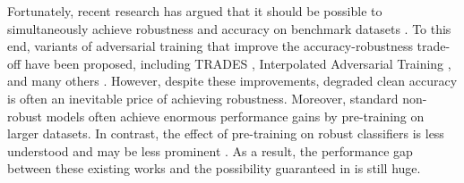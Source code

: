 \documentclass[11pt, letterpaper]{article}
\theoremstyle{plain}
\theoremstyle{definition}
\begin{document}
Fortunately, recent research has argued that it should be possible to simultaneously achieve robustness and accuracy on benchmark datasets \citep{Yang20}. To this end, variants of adversarial training that improve the accuracy-robustness trade-off have been proposed, including TRADES \citep{Zhang19}, Interpolated Adversarial Training \citep{Lamb19}, and many others \citep{TBai21, Raghunathan20, Wang19a, Wang19b, Tramer18, Balaji19}. However, despite these improvements, degraded clean accuracy is often an inevitable price of achieving robustness. Moreover, standard non-robust models often achieve enormous performance gains by pre-training on larger datasets. In contrast, the effect of pre-training on robust classifiers is less understood and may be less prominent \citep{Chen20, Fan21}. As a result, the performance gap between these existing works and the possibility guaranteed in \citep{Yang20} is still huge.
\end{document}
